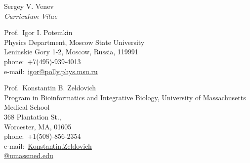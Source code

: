 \documentclass[10pt]{article}
\begin{document}
\begin{cv}{Sergey V. Venev\\{\large \itshape Curriculum Vitae}}
\begin{paracol}{3}
    Prof.\ Igor I. Potemkin\\
    Physics Department, Moscow State University\\
    Leninskie Gory 1-2, Moscow, Russia, 119991\\
    phone:\ +7(495)-939-4013\\
    e-mail:\ \href{mailto:igor@polly.phys.msu.ru}{igor\textrm{@}polly.phys.msu.ru}

\switchcolumn

    Prof.\ Konstantin B. Zeldovich\\
    Program in Bioinformatics and Integrative Biology, University of Massachusetts Medical School\\
    368 Plantation St.,\\ Worcester, MA, 01605\\
    phone:\ +1(508)-856-2354\\
    e-mail:\ \href{mailto:Konstantin.Zeldovich@umassmed.edu}{Konstantin.Zeldovich\\\textrm{@}umassmed.edu}





\end{paracol}




\end{cv}
\end{document}
